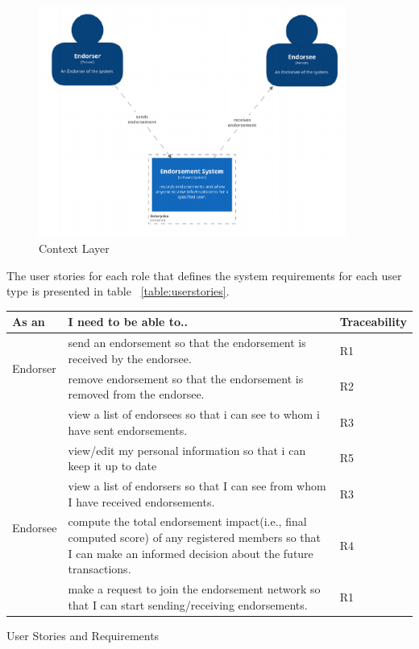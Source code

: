 \begin{figure}
	\centering
	\includegraphics[width=0.9\textwidth]{Images/1SystemContext.eps}
	\caption{Context Layer}
	\label{fig:context}
\end{figure}

The user stories for each role that defines the system requirements for each
user type is presented in table ~\ref{table:userstories}. 
\begin{center} \label{table:userstories} 
	\begin{tabular} {| l | p{9cm} | l |}
		\hline
		\textbf{As an}  & \textbf{I need to be able to..}   & \textbf{Traceability} \\
		\hline
		\multirow{2}{*}{Endorser} & send an endorsement so that the endorsement
		is received by the endorsee.& R1
		\\\cline{2-3} 
		& remove endorsement so that the endorsement is removed from the
		endorsee.  & R2 \\\cline{2-3}
		& view a list of endorsees so that i can see to whom i have sent
		endorsements.& R3 \\\cline{2-3}
		& view/edit my personal information so that i can keep it up to
		date& R5 \\\cline{2-3}
		\hline
		\multirow{2}{*}{Endorsee} & view a list of endorsers so that I can see
		from whom I have received endorsements.& R3 \\\cline{2-3}
		\hline
		\multirow{2}{*}{other users} & compute the total endorsement
		impact(i.e., final computed score) of any registered members so that I
		can make an informed decision about the future transactions.
		& R4 \\\cline{2-3}
		& make a request to join the endorsement network so that I can start
		sending/receiving endorsements.  
		& R1 \\\cline{2-3}
		\hline
	\end{tabular}
	\caption{User Stories and Requirements}
\end{center}

